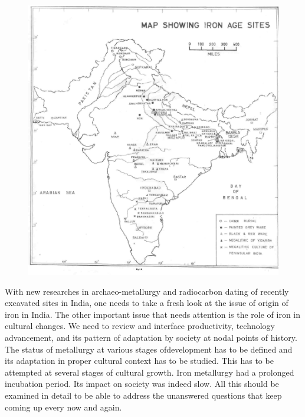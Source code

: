 \begin{figure}[H]
\includegraphics[scale=.82]{images/004.jpg}
\caption{}\label{chap1-fig4}
\end{figure}

With new researches in archaeo-metallurgy and radiocarbon dating of recently excavated sites in India, one needs to take a fresh look at the issue of origin of iron in India. The other important issue that needs attention is the role of iron in cultural changes. We need to review and interface productivity, technology advancement, and its pattern of adaptation by society at nodal points of history. The status of metallurgy at various stages ofdevelopment has to be defined and its adaptation in proper cultural context has to be studied. This has to be attempted at several stages of cultural growth. Iron metallurgy had a prolonged incubation period. Its impact on society was indeed slow. All this should be examined in detail to be able to address the unanswered questions that keep coming up every now and again.

